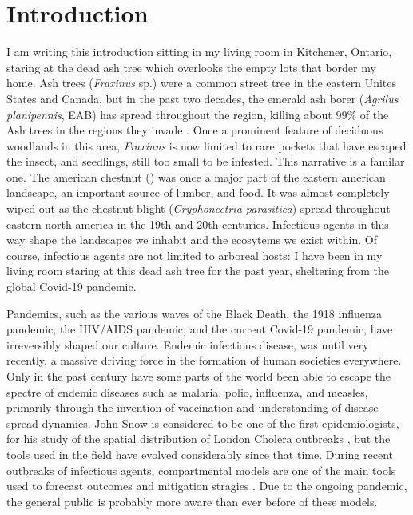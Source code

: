 \chapter{Introduction}

I am writing this introduction sitting in my living room in Kitchener, Ontario, staring at the dead ash tree which overlooks the empty lots that border my home. Ash trees (\textit{Fraxinus} sp.) were a common street tree in the eastern Unites States and Canada, but in the past two decades, the emerald ash borer (\textit{Agrilus planipennis}, EAB) has spread throughout the region, killing about 99\% of the Ash trees in the regions they invade \cite{nrcaneab,herms2014emerald}. Once a prominent feature of deciduous woodlands in this area, \textit{Fraxinus} is now limited to rare pockets that have escaped the insect, and seedlings, still too small to be infested. This narrative is a familar one. The american chestnut () was once a major part of the eastern american landscape, an important source of lumber, and food. It was almost completely wiped out as the chestnut blight (\textit{Cryphonectria parasitica}) spread throughout eastern north america in the 19th and 20th centuries. Infectious agents in this way shape the landscapes we inhabit and the ecosytems we exist within. Of course, infectious agents are not limited to arboreal hosts: I have been in my living room staring at this dead ash tree for the past year, sheltering from the global Covid-19 pandemic. 

Pandemics, such as the various waves of the Black Death, the 1918 influenza pandemic, the HIV/AIDS pandemic, and the current Covid-19 pandemic, have irreversibly shaped our culture. Endemic infectious disease, was until very recently, a massive driving force in the formation of human societies everywhere. Only in the past century have some parts of the world been able to escape the spectre of endemic diseases such as malaria, polio, influenza, and measles, primarily through the invention of vaccination and understanding of disease spread dynamics. John Snow is considered to be one of the first epidemiologists, for his study of the spatial distribution of London Cholera outbreaks \cite{snow1855mode, brauer2019mathematical}, but the tools used in the field have evolved considerably since that time. During recent outbreaks of infectious agents, compartmental models are one of the main tools used to forecast outcomes and mitigation stragies \cite{brauer2008compartmental}. Due to the ongoing pandemic, the general public is probably more aware than ever before of these models.

